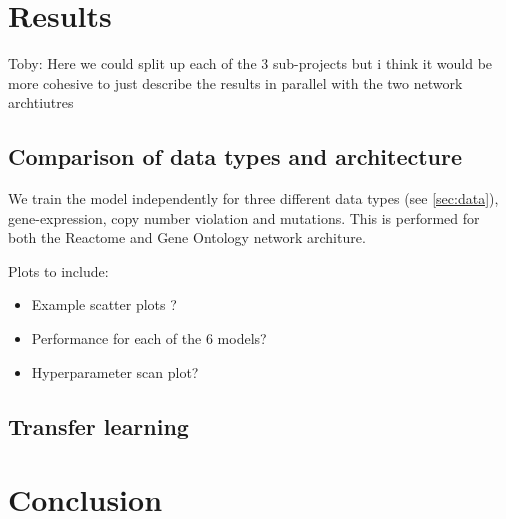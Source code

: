 \documentclass[NOTE, disdraft=true, UKenglish]{\DISCDTLATEXPATH UCLCDTDISdoc}
\begin{document}


\section{Results}
\label{sec:results}
{\color{red}Toby: Here we could split up each of the 3 sub-projects but i think it would be more cohesive to just describe the results in parallel with the two network archtiutres}
\\
\subsection{Comparison of data types and architecture}
We train the model independently for three different data types (see \ref{sec:data}), gene-expression, copy number violation and mutations. This is performed for both the Reactome and Gene Ontology network architure.
\\
{   \color{red}
Plots to include:
\begin{itemize}
    \item Example scatter plots ?
\item Performance for each of the 6 models?
\item Hyperparameter scan plot?
\end{itemize}}
\subsection{Transfer learning}
%

\section{Conclusion}
\label{sec:conclusion}

\printbibliography
%
\end{document}

